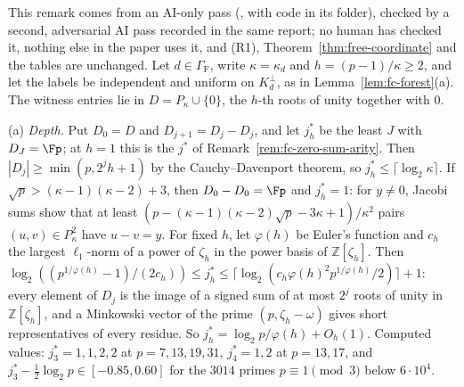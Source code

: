 \begin{remark}
\label{rem:fc-witness-h3}
This remark comes from an AI-only pass (, with code in its folder), checked by a second, adversarial AI pass recorded in the same report; no human has checked it, nothing else in the paper uses it, and (R1), Theorem~\ref{thm:free-coordinate} and the tables are unchanged. Let $d \in \Gamma_{\mathrm F}$, write $\kappa = \kappa_d$ and $h = (p-1)/\kappa \ge 2$, and let the labels be independent and uniform on $K_d^\perp$, as in Lemma~\ref{lem:fc-forest}(a). The witness entries lie in $D = P_\kappa\cup\{0\}$, the $h$-th roots of unity together with $0$.

\textup{(a)} \emph{Depth.} Put $D_0 = D$ and $D_{j+1} = D_j - D_j$, and let $j^*_h$ be the least $J$ with $D_J = \Fp$; at $h = 1$ this is the $j^*$ of Remark~\ref{rem:fc-zero-sum-arity}. Then $|D_j| \ge \min(p, 2^jh+1)$ by the Cauchy--Davenport theorem, so $j^*_h \le \lceil\log_2\kappa\rceil$. If $\sqrt p > (\kappa-1)(\kappa-2)+3$, then $D_0 - D_0 = \Fp$ and $j^*_h = 1$: for $y \ne 0$, Jacobi sums show that at least $(p - (\kappa-1)(\kappa-2)\sqrt p - 3\kappa + 1)/\kappa^2$ pairs $(u,v) \in P_\kappa^2$ have $u - v = y$. For fixed $h$, let $\varphi(h)$ be Euler's function and $c_h$ the largest $\ell_1$-norm of a power of $\zeta_h$ in the power basis of $\mathbb{Z}[\zeta_h]$. Then $\log_2((p^{1/\varphi(h)}-1)/(2c_h)) \le j^*_h \le \lceil\log_2(c_h\varphi(h)^2p^{1/\varphi(h)}/2)\rceil + 1$: every element of $D_j$ is the image of a signed sum of at most $2^j$ roots of unity in $\mathbb{Z}[\zeta_h]$, and a Minkowski vector of the prime $(p,\zeta_h-\omega)$ gives short representatives of every residue. So $j^*_h = \log_2p/\varphi(h) + O_h(1)$. Computed values: $j^*_3 = 1,1,2,2$ at $p = 7,13,19,31$, $j^*_4 = 1,2$ at $p = 13,17$, and $j^*_3 - \tfrac12\log_2p \in [-0.85, 0.60]$ for the $3014$ primes $p \equiv 1 \pmod 3$ below $6\cdot 10^4$.


\end{remark}
